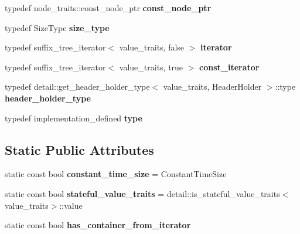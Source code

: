 \begin{DoxyCompactItemize}
typedef node\+\_\+traits\+::const\+\_\+node\+\_\+ptr {\bfseries const\+\_\+node\+\_\+ptr}
\item 
\mbox{\label{classboost_1_1intrusive_1_1suffix__tree__impl_ad98ea23cb22b9adc18366b5d8ab56d9b}} 
typedef Size\+Type {\bfseries size\+\_\+type}
\item 
\mbox{\label{classboost_1_1intrusive_1_1suffix__tree__impl_a2df3b52dced59346b59db470e93ba87c}} 
typedef suffix\+\_\+tree\+\_\+iterator$<$ value\+\_\+traits, false $>$ {\bfseries iterator}
\item 
\mbox{\label{classboost_1_1intrusive_1_1suffix__tree__impl_a221fd6a26db0f6aa44951317caa66126}} 
typedef suffix\+\_\+tree\+\_\+iterator$<$ value\+\_\+traits, true $>$ {\bfseries const\+\_\+iterator}
\item 
\mbox{\label{classboost_1_1intrusive_1_1suffix__tree__impl_acb00482132fdd79dc983b313f596e364}} 
typedef detail\+::get\+\_\+header\+\_\+holder\+\_\+type$<$ value\+\_\+traits, Header\+Holder $>$\+::type {\bfseries header\+\_\+holder\+\_\+type}
\item 
\mbox{\label{classboost_1_1intrusive_1_1suffix__tree__impl_a256654460348de1003229187c2483bc0}} 
typedef implementation\+\_\+defined {\bfseries type}
\end{DoxyCompactItemize}
\subsection*{Static Public Attributes}
\begin{DoxyCompactItemize}
\item 
\mbox{\label{classboost_1_1intrusive_1_1suffix__tree__impl_a9c2e0b561fdd556da686d16c8b6feb40}} 
static const bool {\bfseries constant\+\_\+time\+\_\+size} = Constant\+Time\+Size
\item 
\mbox{\label{classboost_1_1intrusive_1_1suffix__tree__impl_ae4e217b23e8ea4d529d0aa2d0314462d}} 
static const bool {\bfseries stateful\+\_\+value\+\_\+traits} = detail\+::is\+\_\+stateful\+\_\+value\+\_\+traits$<$value\+\_\+traits$>$\+::value
\item 
static const bool {\bfseries has\+\_\+container\+\_\+from\+\_\+iterator}
\end{DoxyCompactItemize}


